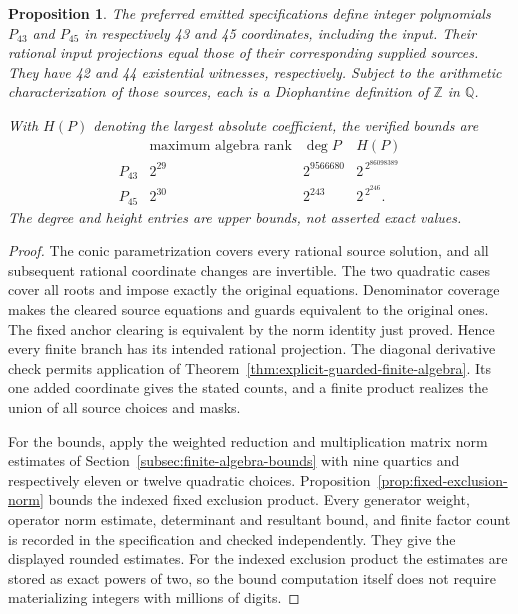 \documentclass[11pt]{article}
\newtheorem{proposition}[theorem]{Proposition}
\theoremstyle{definition}
\begin{document}
\begin{proposition}\label{prop:shared-source-compilation}
The preferred emitted specifications define integer polynomials
$P_{43}$ and $P_{45}$ in respectively 43 and 45 coordinates,
including the input.  Their rational input projections equal
those of their corresponding supplied sources.  They have 42
and 44 existential witnesses, respectively.  Subject to the
arithmetic characterization of those sources, each is a
Diophantine definition of $\mathbb Z$ in $\mathbb Q$.

With $H(P)$ denoting the largest absolute coefficient, the
verified bounds are
\[
 \begin{array}{c|c|c|c}
 &\text{maximum algebra rank}&\deg P&H(P)\\ \hline
 P_{43}&2^{29}&2^{9566680}&2^{\,2^{86098389}}\\
 P_{45}&2^{30}&2^{243}&2^{\,2^{246}}.
 \end{array}
\]
The degree and height entries are upper bounds, not asserted
exact values.
\end{proposition}
\begin{proof}
The conic parametrization covers every rational source solution,
and all subsequent rational coordinate changes are invertible.
The two quadratic cases cover all roots and impose exactly the
original equations.  Denominator coverage makes the cleared
source equations and guards equivalent to the original ones.
The fixed anchor clearing is equivalent by the norm identity
just proved.  Hence every finite branch has its intended
rational projection.  The diagonal derivative check permits
application of Theorem~\ref{thm:explicit-guarded-finite-algebra}.
Its one added coordinate gives the stated counts, and a finite
product realizes the union of all source choices and masks.

For the bounds, apply the weighted reduction and multiplication
matrix norm estimates of Section~\ref{subsec:finite-algebra-bounds}
with nine quartics and respectively eleven or twelve quadratic
choices.  Proposition~\ref{prop:fixed-exclusion-norm} bounds the
indexed fixed exclusion product.  Every generator weight,
operator norm estimate, determinant and resultant bound, and
finite factor count is recorded in the specification and checked
independently.  They give the displayed rounded estimates.  For
the indexed exclusion product the estimates are stored as exact
powers of two, so the bound computation itself does not require
materializing integers with millions of digits.
\end{proof}
\end{document}

